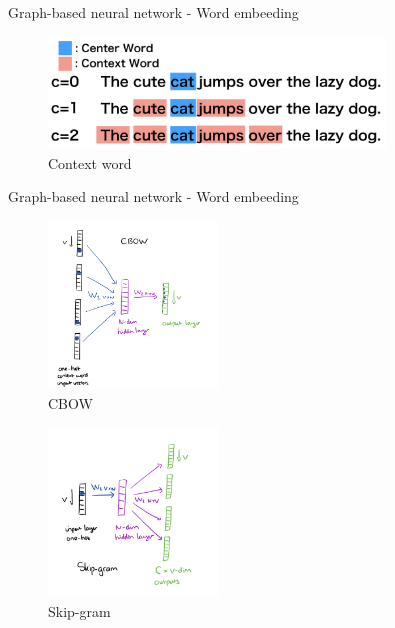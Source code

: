 \begin{frame}{Graph-based neural network - Word embeeding}
    \begin{figure}[htp]
        \centering
        \includegraphics[width=0.8\textwidth]{topics/201010-zhang2019comprehensive/assets/img/context-word.png}
        \caption{Context word}
    \end{figure}
\end{frame}

\begin{frame}{Graph-based neural network - Word embeeding}
    \begin{multicols}{2}
        \begin{figure}[htp]
            \centering
            \includegraphics[width=0.4\textwidth]{topics/201010-zhang2019comprehensive/assets/img/cbow.png}
            \caption{CBOW}
        \end{figure}

        \begin{figure}[htp]
            \centering
            \includegraphics[width=0.4\textwidth]{topics/201010-zhang2019comprehensive/assets/img/skip-gram.png}
            \caption{Skip-gram}
        \end{figure}
    \end{multicols}
\end{frame}

